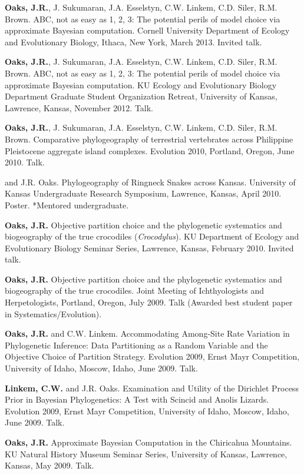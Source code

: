 \myHangIndent
{\bf Oaks, J.R.}, J. Sukumaran, J.A. Esselstyn, C.W. Linkem, C.D. Siler, R.M.
Brown.
ABC, not as easy as 1, 2, 3: The potential perils of model choice via
approximate Bayesian computation.
Cornell University Department of Ecology and Evolutionary Biology, Ithaca,
New York, March 2013.
Invited talk.

\myHangIndent
{\bf Oaks, J.R.}, J. Sukumaran, J.A. Esselstyn, C.W. Linkem, C.D. Siler, R.M.
Brown.
ABC, not as easy as 1, 2, 3: The potential perils of model choice via
approximate Bayesian computation.
KU Ecology and Evolutionary Biology Department Graduate Student Organization
Retreat, University of Kansas, Lawrence, Kansas, November 2012.
Talk.

\myHangIndent
{\bf Oaks, J.R.}, J. Sukumaran, J.A. Esselstyn, C.W. Linkem, C.D. Siler, R.M.
Brown.
Comparative phylogeography of terrestrial vertebrates across Philippine
Pleistocene aggregate island complexes.
Evolution 2010, Portland, Oregon, June 2010.
Talk.

\myHangIndent
{} and J.R. Oaks.
Phylogeography of Ringneck Snakes across Kansas.
University of Kansas Undergraduate Research Symposium, Lawrence, Kansas, April
2010.
Poster.
*Mentored undergraduate.

\myHangIndent
{\bf Oaks, J.R.}
Objective partition choice and the phylogenetic systematics and biogeography of
the true crocodiles (\emph{Crocodylus}).
KU Department of Ecology and Evolutionary Biology Seminar Series, Lawrence,
Kansas, February 2010.
Invited talk.

\myHangIndent
{\bf Oaks, J.R.}
Objective partition choice and the phylogenetic systematics and biogeography of
the true crocodiles.
Joint Meeting of Ichthyologists and Herpetologists, Portland, Oregon, July
2009.
Talk (Awarded best student paper in Systematics/Evolution).

\myHangIndent
{\bf Oaks, J.R.} and C.W. Linkem.
Accommodating Among-Site Rate Variation in Phylogenetic Inference: Data
Partitioning as a Random Variable and the Objective Choice of Partition
Strategy.
Evolution 2009, Ernst Mayr Competition, University of Idaho, Moscow, Idaho,
June 2009.
Talk.

\myHangIndent
{\bf Linkem, C.W.} and J.R. Oaks.
Examination and Utility of the Dirichlet Process Prior in Bayesian
Phylogenetics: A Test with Scincid and Anolis Lizards.
Evolution 2009, Ernst Mayr Competition, University of Idaho, Moscow, Idaho,
June 2009.
Talk.

\myHangIndent
{\bf Oaks, J.R.}
Approximate Bayesian Computation in the Chiricahua Mountains.
KU Natural History Museum Seminar Series, University of Kansas, Lawrence,
Kansas, May 2009.
Talk.

